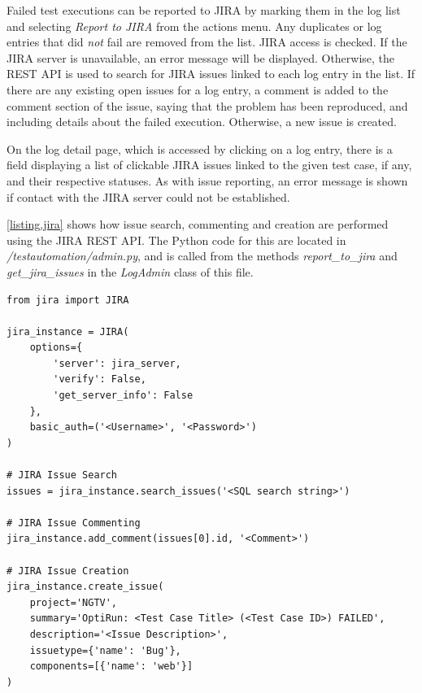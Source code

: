 Failed test executions can be reported to JIRA by marking them in the log list and selecting \emph{Report to JIRA} from the actions menu. Any duplicates or log entries that did \emph{not} fail are removed from the list. JIRA access is checked. If the JIRA server is unavailable, an error message will be displayed. Otherwise, the REST API is used to search for JIRA issues linked to each log entry in the list. If there are any existing open issues for a log entry, a comment is added to the comment section of the issue, saying that the problem has been reproduced, and including details about the failed execution. Otherwise, a new issue is created.

On the log detail page, which is accessed by clicking on a log entry, there is a field displaying a list of clickable JIRA issues linked to the given test case, if any, and their respective statuses. As with issue reporting, an error message is shown if contact with the JIRA server could not be established.

\lstlistingname \space \ref{listing.jira} shows how issue search, commenting and creation are performed using the JIRA REST API. The Python code for this are located in \emph{/testautomation/admin.py}, and is called from the methods \emph{report\_to\_jira} and \emph{get\_jira\_issues} in the \emph{LogAdmin} class of this file.

\vspace{4mm}
\begin{lstlisting}[caption={Issue search, commenting and creation using the \emph{JIRA REST API}}, label={listing.jira}, float=tp, floatplacement=tbp]
from jira import JIRA

jira_instance = JIRA(
    options={
        'server': jira_server,
        'verify': False,
        'get_server_info': False
    },
    basic_auth=('<Username>', '<Password>')
)

# JIRA Issue Search
issues = jira_instance.search_issues('<SQL search string>')
        
# JIRA Issue Commenting
jira_instance.add_comment(issues[0].id, '<Comment>')

# JIRA Issue Creation
jira_instance.create_issue(
    project='NGTV',
    summary='OptiRun: <Test Case Title> (<Test Case ID>) FAILED',
    description='<Issue Description>',
    issuetype={'name': 'Bug'},
    components=[{'name': 'web'}]
)
\end{lstlisting}

